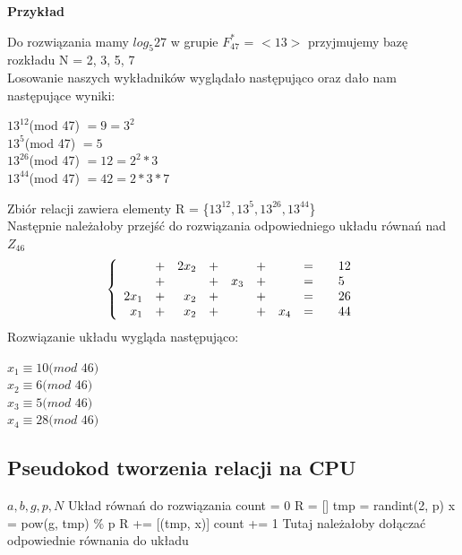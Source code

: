 \documentclass{article}
\begin{document}
\textbf{Przykład}

Do rozwiązania mamy $log_{5}27$ w grupie $F_{47}^*$ = $<13>$ przyjmujemy bazę rozkładu N = {2, 3, 5, 7}\\
Losowanie naszych wykładników wyglądało następująco oraz dało nam następujące wyniki:

\begin{center}
    $13^{12}$(mod 47) $= 9 = 3^2$\\ 
    $13^5$(mod 47) $ =5$\\
    $13^{26}$(mod 47) $= 12 = 2^2 * 3$\\
    $13^{44}$(mod 47) $= 42 = 2 * 3 * 7$\\
\end{center}

Zbiór relacji zawiera elementy R = \{$13^{12}, 13^{5}, 13^{26}, 13^{44}$\}\\
Następnie należałoby przejść do rozwiązania odpowiedniego układu równań nad $Z_{46}$
\[
\left\{
\begin{array}{rcrcrcrc@{\qquad}l}
                & +  & 2x_2 & +   &     & + &  & =  & 12 \\
                & +  &      & +   & x_3 & + &  & =  &  5\\
                2x_1 &        +   & x_2 & + &  & + &  & =  & 26 \\
                x_1  &        +   & x_2 & + &  & + & x_4 & =  & 44 \\

\end{array}
\right.
\]
Rozwiązanie układu wygląda następująco:

\begin{center}



$x_1 \equiv 10 (mod$ $46)$\\
$x_2 \equiv 6 (mod$ $46)$\\
$x_3 \equiv 5 (mod$ $46)$\\
$x_4 \equiv 28 (mod$ $46)$\\
\end{center}

\newpage

\subsection{Pseudokod tworzenia relacji na CPU}
\begin{algorithm}[H]
\renewcommand{\algorithmicrequire}{\textbf{Wejście:}}
\renewcommand{\algorithmicensure}{\textbf{Wyjście:}}
\begin{algorithmic}[1]
    \REQUIRE $a, b, g, p, N$
    \ENSURE  Układ równań do rozwiązania
\STATE count = 0
\STATE R = []
\STATE tmp = randint(2, p)
\STATE x = pow(g, tmp) \% p
\STATE R += [(tmp, x)]
\STATE count += 1
\ENDIF
\ENDWHILE
{}
\STATE Tutaj należałoby dołączać odpowiednie równania do układu
\ENDFOR
{}
\end{algorithmic}
\end{algorithm}
\end{document}
